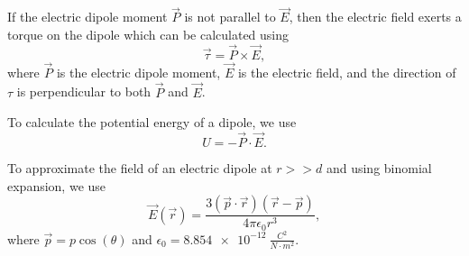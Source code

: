 If the electric dipole moment $\vec{P}$ is not parallel to $\vec{E}$, then the electric field exerts a torque on the dipole which can be calculated using
\begin{equation}
\vec{\tau} = \vec{P} \times \vec{E},
\end{equation}
where $\vec{P}$ is the electric dipole moment, $\vec{E}$ is the electric field, and the direction of $\tau$ is perpendicular to both $\vec{P}$ and $\vec{E}$.

To calculate the potential energy of a dipole, we use
\begin{equation}
U = -\vec{P}\cdot \vec{E}.
\end{equation}

To approximate the field of an electric dipole at $r>>d$ and using binomial expansion, we use
\begin{equation}
\vec{E}(\vec{r}) = \frac{3(\vec{p}\cdot \vec{r})(\vec{r} - \vec{p})}{4 \pi \epsilon_0 r^3},
\end{equation}
where $\vec{p} = p\cos(\theta)$ and $\epsilon_0 = \SI{8.854e-12}{\frac{C^2}{N \cdot m^2}}$.


